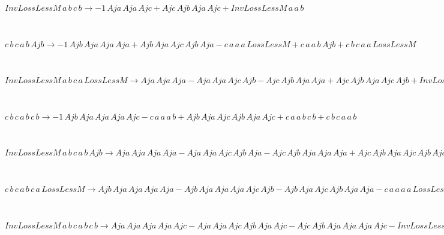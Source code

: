 \begin{minipage}{6in}
$
InvLossLessM\,
 a\,
 b\,
 c\,
 b\rightarrow -1\,
 Aja\,
 Aja\,
 Ajc + Ajc\,
 Ajb\,
 Aja\,
 Ajc + InvLossLessM\,
 a\,
 a\,
 b
$
\end{minipage}\medskip \\
\begin{minipage}{6in}
$
c\,
 b\,
 c\,
 a\,
 b\,
 Ajb\rightarrow -1\,
 Ajb\,
 Aja\,
 Aja\,
 Aja + Ajb\,
 Aja\,
 Ajc\,
 Ajb\,
 Aja - c\,
 a\,
 a\,
 a\,
 LossLessM + c\,
 a\,
 a\,
 b\,
 Ajb + c\,
 b\,
 c\,
 a\,
 a\,
 LossLessM
$
\end{minipage}\medskip \\
\begin{minipage}{6in}
$
InvLossLessM\,
 a\,
 b\,
 c\,
 a\,
 LossLessM\rightarrow Aja\,
 Aja\,
 Aja - Aja\,
 Aja\,
 Ajc\,
 Ajb - Ajc\,
 Ajb\,
 Aja\,
 Aja + Ajc\,
 Ajb\,
 Aja\,
 Ajc\,
 Ajb + InvLossLessM\,
 a\,
 a\,
 a\,
 LossLessM
$
\end{minipage}\medskip \\
\begin{minipage}{6in}
$
c\,
 b\,
 c\,
 a\,
 b\,
 c\,
 b\rightarrow -1\,
 Ajb\,
 Aja\,
 Aja\,
 Aja\,
 Ajc - c\,
 a\,
 a\,
 a\,
 b + Ajb\,
 Aja\,
 Ajc\,
 Ajb\,
 Aja\,
 Ajc + c\,
 a\,
 a\,
 b\,
 c\,
 b + c\,
 b\,
 c\,
 a\,
 a\,
 b
$
\end{minipage}\medskip \\
\begin{minipage}{6in}
$
InvLossLessM\,
 a\,
 b\,
 c\,
 a\,
 b\,
 Ajb\rightarrow Aja\,
 Aja\,
 Aja\,
 Aja - Aja\,
 Aja\,
 Ajc\,
 Ajb\,
 Aja - Ajc\,
 Ajb\,
 Aja\,
 Aja\,
 Aja + Ajc\,
 Ajb\,
 Aja\,
 Ajc\,
 Ajb\,
 Aja - InvLossLessM\,
 a\,
 a\,
 a\,
 a\,
 LossLessM + InvLossLessM\,
 a\,
 a\,
 a\,
 b\,
 Ajb + InvLossLessM\,
 a\,
 b\,
 c\,
 a\,
 a\,
 LossLessM
$
\end{minipage}\medskip \\
\begin{minipage}{6in}
$
c\,
 b\,
 c\,
 a\,
 b\,
 c\,
 a\,
 LossLessM\rightarrow Ajb\,
 Aja\,
 Aja\,
 Aja\,
 Aja - Ajb\,
 Aja\,
 Aja\,
 Aja\,
 Ajc\,
 Ajb - Ajb\,
 Aja\,
 Ajc\,
 Ajb\,
 Aja\,
 Aja - c\,
 a\,
 a\,
 a\,
 a\,
 LossLessM + Ajb\,
 Aja\,
 Ajc\,
 Ajb\,
 Aja\,
 Ajc\,
 Ajb + c\,
 a\,
 a\,
 b\,
 c\,
 a\,
 LossLessM + c\,
 b\,
 c\,
 a\,
 a\,
 a\,
 LossLessM
$
\end{minipage}\medskip \\
\begin{minipage}{6in}
$
InvLossLessM\,
 a\,
 b\,
 c\,
 a\,
 b\,
 c\,
 b\rightarrow Aja\,
 Aja\,
 Aja\,
 Aja\,
 Ajc - Aja\,
 Aja\,
 Ajc\,
 Ajb\,
 Aja\,
 Ajc - Ajc\,
 Ajb\,
 Aja\,
 Aja\,
 Aja\,
 Ajc - InvLossLessM\,
 a\,
 a\,
 a\,
 a\,
 b + Ajc\,
 Ajb\,
 Aja\,
 Ajc\,
 Ajb\,
 Aja\,
 Ajc + InvLossLessM\,
 a\,
 a\,
 a\,
 b\,
 c\,
 b + InvLossLessM\,
 a\,
 b\,
 c\,
 a\,
 a\,
 b
$
\end{minipage}\medskip \\
